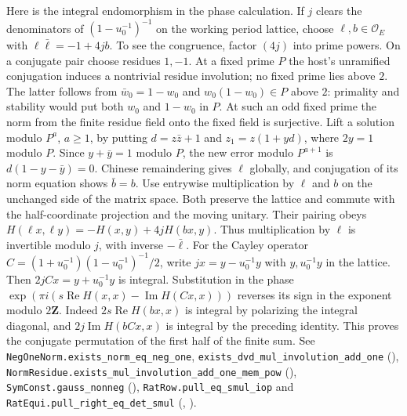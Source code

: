 Here is the integral endomorphism in the phase calculation. If $j$ clears
the denominators of $(1-u_0^{-1})^{-1}$ on the working period lattice,
choose $\ell,b\in\mathcal O_E$ with $\ell\bar\ell=-1+4jb$. To see the
congruence, factor $(4j)$ into prime powers. On a conjugate pair choose
residues $1,-1$. At a fixed prime $P$ the host's unramified conjugation
induces a nontrivial residue involution; no fixed prime lies above $2$.
The latter follows from $\bar w_0=1-w_0$ and $w_0(1-w_0)\in P$ above
$2$: primality and stability would put both $w_0$ and $1-w_0$ in $P$.
At such an odd fixed prime the norm from the finite residue field onto
the fixed field is surjective. Lift a solution modulo $P^a$, $a\ge1$,
by putting $d=z\bar z+1$ and $z_1=z(1+yd)$, where $2y=1$ modulo
$P$. Since $y+\bar y=1$ modulo $P$, the new error modulo $P^{a+1}$
is $d(1-y-\bar y)=0$. Chinese remaindering gives $\ell$ globally, and
conjugation of its norm equation shows $\bar b=b$.
Use entrywise multiplication by $\ell$ and $b$ on the unchanged side
of the matrix space. Both preserve the lattice and commute with the
half-coordinate projection and the moving unitary. Their pairing obeys
$H(\ell x,\ell y)=-H(x,y)+4jH(bx,y)$. Thus multiplication by $\ell$
is invertible modulo $j$, with inverse $-\bar\ell$. For the Cayley operator
$C=(1+u_0^{-1})(1-u_0^{-1})^{-1}/2$, write $jx=y-u_0^{-1}y$ with
$y,u_0^{-1}y$ in the lattice. Then $2jCx=y+u_0^{-1}y$ is integral.
Substitution in the phase
$\exp(\pi i(s\operatorname{Re}H(x,x)-\operatorname{Im}H(Cx,x)))$
reverses its sign in the exponent modulo $2\mathbf Z$. Indeed
$2s\operatorname{Re}H(bx,x)$ is integral by polarizing the integral
diagonal, and $2j\operatorname{Im}H(bCx,x)$ is integral by the
preceding identity. This proves the conjugate permutation of the first
half of the finite sum. See \nolinkurl{NegOneNorm.exists_norm_eq_neg_one},
\nolinkurl{exists_dvd_mul_involution_add_one}
(),
\nolinkurl{NormResidue.exists_mul_involution_add_one_mem_pow}
(),
\nolinkurl{SymConst.gauss_nonneg}
(),
\nolinkurl{RatRow.pull_eq_smul_iop} and \nolinkurl{RatEqui.pull_right_eq_det_smul}
(,
).

